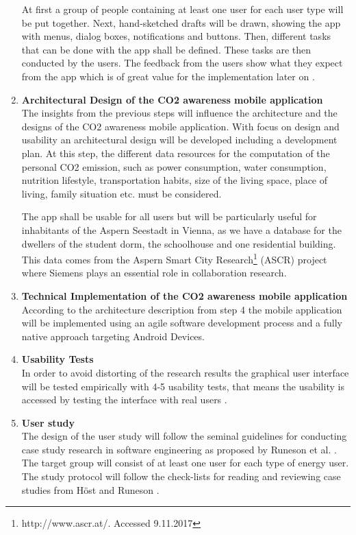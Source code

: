 \begin{enumerate}
	At first a group of people containing at least one user for each user type will be put together.  Next, hand-sketched drafts will be drawn, showing the app with menus, dialog boxes, notifications and buttons. Then, different tasks that can be done with the app shall be defined. These tasks are then conducted by the users. The feedback from the users show what they expect from the app which is of great value for the implementation later on \cite{snyder2003paper}.
	
	\item \textbf{Architectural Design of the CO2 awareness mobile application} \\
	The insights from the previous steps will influence the architecture and the designs of the CO2 awareness mobile application. With focus on design and usability an architectural design will be developed including a development plan. At this step, the different data resources for the computation of the personal CO2 emission, such as power consumption, water consumption, nutrition lifestyle, transportation habits, size of the living space, place of living, family situation etc. must be considered.
	
	The app shall be usable for all users but will be particularly useful for inhabitants of the Aspern Seestadt in Vienna, as we have a database for the dwellers of the student dorm, the schoolhouse and one residential building. This data comes from the Aspern Smart City Research\footnote{http://www.ascr.at/. Accessed 9.11.2017} (ASCR) project where Siemens plays an essential role in collaboration research. 
	
	\item \textbf{Technical Implementation of the CO2 awareness mobile application} \\
	According to the architecture description from step 4 the mobile application will be implemented using an agile software development process and a fully native approach targeting Android Devices.
	
	\item \textbf{Usability Tests} \\
	In order to avoid distorting of the research results the graphical user interface will be tested empirically with 4-5 usability tests, that means the usability is accessed by testing the interface with real users \cite{nielsen1994usability}.
	
	\item \textbf{User study} \\
	The design of the user study will follow the seminal guidelines for conducting case study research in software engineering as proposed by Runeson et al. \cite{runeson2012case}. The target group will consist of at least one user for each type of energy user. The study protocol will follow the check-lists for reading and reviewing case studies from H\"ost and Runeson \cite{host2007checklists}.
	

\end{enumerate}
